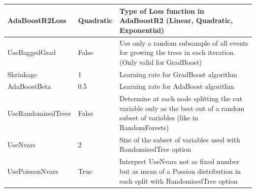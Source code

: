 \documentclass[11pt]{scrartcl}
\begin{document}
\begin{longtable}[c]{|p{4cm}|p{2.5cm}|p{7cm}|}
AdaBoostR2Loss       & Quadratic              & Type of Loss function in AdaBoostR2 (Linear, Quadratic, Exponential)                                                                                                                                                                                                                                    \\ \hline
UseBaggedGrad        & False                  & Use only a random subsample of all events for growing the trees in each iteration. (Only valid for GradBoost)                                                                                                                                                                                           \\ \hline
Shrinkage            & 1                      & Learning rate for GradBoost algorithm                                                                                                                                                                                                                                                                   \\ \hline
AdaBoostBeta         & 0.5                    & Learning rate for AdaBoost algorithm                                                                                                                                                                                                                                                                    \\ \hline
UseRandomisedTrees   & False                  & Determine at each node splitting the cut variable only as the best out of a random subset of variables (like in RandomForests)                                                                                                                                                                          \\ \hline
UseNvars             & 2                      & Size of the subset of variables used with RandomisedTree option                                                                                                                                                                                                                                         \\ \hline
UsePoissonNvars      & True                   & Interpret UseNvars not as fixed number but as mean of a Possion distribution in each split with RandomisedTree option                                                                                                                                                                                   \\ \hline

\end{longtable}
\end{document}
